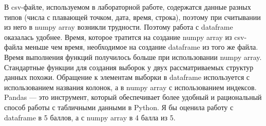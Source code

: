 В csv-файле, используемом в лабораторной работе, содержатся данные разных типов (числа с плавающей точком, дата, время, строка), поэтому при считывании из него в numpy array возникли трудности. Поэтому работа с dataframe оказалась удобнее. Время, которое тратится на создание numpy array из csv-файла меньше чем время, необходимое на создание dataframe из того же файла. Время выполнения функций получилось больше при использовании numpy array. Стандартные функции для создания выборок у двух рассматриваемых структур данных похожи. Обращение к элементам выборки в dataframe используется с использованием названия колонок, а в numpy array с использованием индексов. Pandas --- это инструмент, который обеспечивает более удобный и рациональный способ работы с табличными данными в Python. Я бы оценила работу с dataframe в 5 баллов, а с numpy array в 4 балла из 5. 


\clearpage
{}
{}
\renewcommand\bibname{Список литературы}



